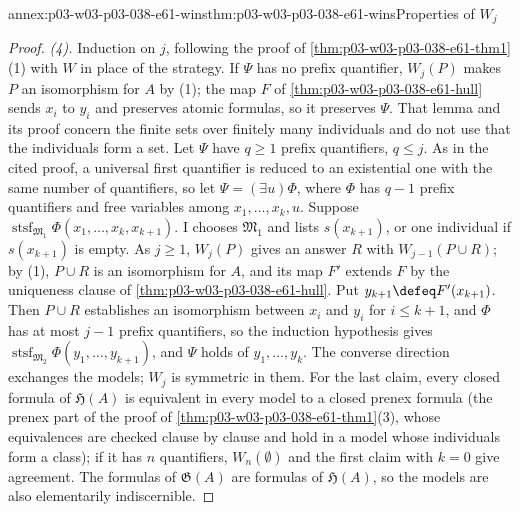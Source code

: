 \begin{annexitem}{annex:p03-w03-p03-038-e61-wins}{thm:p03-w03-p03-038-e61-wins}{Properties of \(W_j\)}
\begin{proof}
\emph{(4).} Induction on \(j\), following the proof of
\cref{thm:p03-w03-p03-038-e61-thm1}(1) with \(W\) in place of the
strategy. If \(\Psi\) has no prefix quantifier, \(W_j(P)\) makes \(P\)
an isomorphism for \(A\) by (1); the map \(F\) of
\cref{thm:p03-w03-p03-038-e61-hull} sends \(x_i\) to \(y_i\) and preserves
atomic formulas, so it preserves \(\Psi\). That lemma and its proof concern
the finite sets over finitely many individuals and do not use that the
individuals form a set. Let \(\Psi\) have \(q\ge1\) prefix quantifiers,
\(q\le j\). As in the cited proof, a universal first quantifier is reduced
to an existential one with the same number of quantifiers, so let
\(\Psi=(\exists u)\Phi\), where \(\Phi\) has \(q-1\) prefix quantifiers and
free variables among \(x_1,\ldots,x_k,u\). Suppose
\(\operatorname{stsf}_{\mathfrak M_1}\Phi(x_1,\ldots,x_k,x_{k+1})\). I
chooses \(\mathfrak M_1\) and lists \(s(x_{k+1})\), or one individual if
\(s(x_{k+1})\) is empty. As \(j\ge1\), \(W_j(P)\) gives an answer \(R\)
with \(W_{j-1}(P\cup R)\); by (1), \(P\cup R\) is an isomorphism for
\(A\), and its map \(F'\) extends \(F\) by the uniqueness clause of
\cref{thm:p03-w03-p03-038-e61-hull}. Put \(y_{k+1}\defeq F'(x_{k+1})\).
Then \(P\cup R\) establishes an isomorphism between \(x_i\) and \(y_i\)
for \(i\le k+1\), and \(\Phi\) has at most \(j-1\) prefix quantifiers, so
the induction hypothesis gives
\(\operatorname{stsf}_{\mathfrak M_2}\Phi(y_1,\ldots,y_{k+1})\), and
\(\Psi\) holds of \(y_1,\ldots,y_k\). The converse direction exchanges the
models; \(W_j\) is symmetric in them. For the last claim, every closed
formula of \(\mathfrak H(A)\) is equivalent in every model to a closed
prenex formula (the prenex part of the proof of
\cref{thm:p03-w03-p03-038-e61-thm1}(3), whose equivalences are checked
clause by clause and hold in a model whose individuals form a class); if
it has \(n\) quantifiers, \(W_n(\emptyset)\) and the first claim with
\(k=0\) give agreement. The formulas of \(\mathfrak G(A)\) are formulas of
\(\mathfrak H(A)\), so the models are also elementarily indiscernible.
\end{proof}
\end{annexitem}

